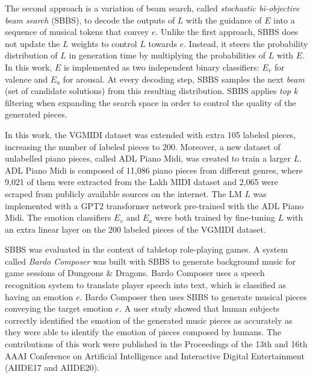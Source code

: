 The second approach is a variation of beam search, called \textit{stochastic bi-objective beam search} (SBBS), to decode the outputs of $L$ with the guidance of $E$ into a sequence of musical tokens that convey $e$. Unlike the first approach, SBBS does not update the $L$ weights to control $L$ towards $e$. Instead, it steers the probability distribution of $L$ in generation time by multiplying the probabilities of $L$ with $E$. In this work, $E$ is implemented as two independent binary classifiers: $E_v$ for valence and $E_a$ for arousal. At every decoding step, SBBS samples the next \textit{beam} (set of candidate solutions) from this resulting distribution. SBBS applies \textit{top k} filtering when expanding the search space in order to control the quality of the generated pieces.

In this work, the VGMIDI dataset was extended with extra 105 labeled pieces, increasing the number of labeled pieces to 200. Moreover, a new dataset of unlabelled piano pieces, called ADL Piano Midi, was created to train a larger $L$. ADL Piano Midi is composed of 11,086 piano pieces from different genres, where 9,021 of them were extracted from the Lakh MIDI dataset \cite{raffel2016learning} and 2,065 were scraped from publicly available sources on the internet. The LM $L$ was implemented with a GPT2 \cite{radford2019language} transformer network pre-trained with the ADL Piano Midi. The emotion classifiers $E_v$ and $E_a$ were both trained by fine-tuning $L$ with an extra linear layer on the 200 labeled pieces of the VGMIDI dataset.

SBBS was evaluated in the context of tabletop role-playing games. A system called \textit{Bardo Composer} was built with SBBS to generate background music for game sessions of Dungeons \& Dragons. Bardo Composer uses a speech recognition system to translate player speech into text, which is classified as having an emotion $e$. Bardo Composer then uses SBBS to generate musical pieces conveying the target emotion $e$. A user study showed that human subjects correctly identified the emotion of the generated music pieces as accurately as they were able to identify the emotion of pieces composed by humans. The contributions of this work were published in the Proceedings of the 13th \cite{padovani2017} and 16th \cite{ferreira2020computer} AAAI Conference on Artificial Intelligence and Interactive Digital Entertainment (AIIDE17 and AIIDE20).


